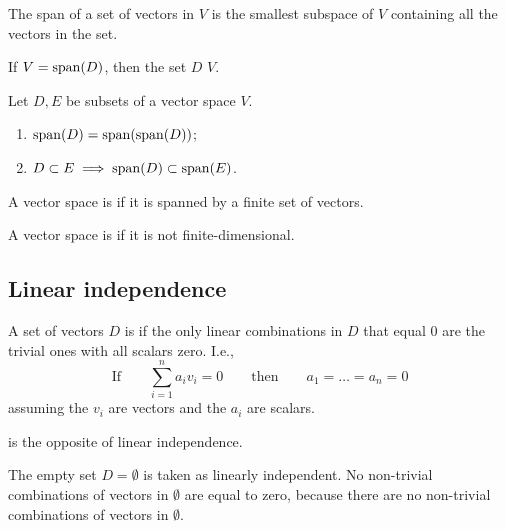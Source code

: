 \begin{proposition}
The span of a set of vectors in $V$ is the smallest subspace of $V$ containing all the vectors in the set.
\end{proposition}

\begin{definition}
If $V = \operatorname{span}(D)$, then the set $D$  $V$.
\end{definition}

\begin{lemma}
Let $D,E$ be subsets of a vector space $V$.
\begin{enumerate}
\item $\operatorname{span}(D) = \operatorname{span}(\operatorname{span}(D))$;
\item $D\subset E \implies \operatorname{span}(D) \subset \operatorname{span}(E)$.
\end{enumerate}
\label{lemma:span}
\end{lemma}

\begin{definition}
A vector space is  if it is spanned by a finite set of vectors.

A vector space is  if it is not finite-dimensional.
\end{definition}
\subsection{Linear independence}
\begin{definition}
A set of vectors $D$ is  if the only linear combinations in $D$ that equal $0$ are the trivial ones with all scalars zero. I.e.,
\[ \text{If} \qquad \sum_{i=1}^n a_iv_i = 0 \qquad \text{then} \qquad a_1=\ldots=a_n = 0  \]
assuming the $v_i$ are vectors and the $a_i$ are scalars.

 is the opposite of linear independence.
\end{definition}
The empty set $D=\emptyset$ is taken as linearly independent. No non-trivial combinations of vectors in $\emptyset$ are equal to zero, because there are no non-trivial combinations of vectors in $\emptyset$.

